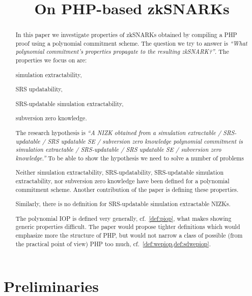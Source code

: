 \documentclass[runningheads,11pt]{llncs}
\title{On PHP-based zkSNARKs}
\author{}
\institute{}
\newcommand{\say}[1]{\emph{``#1''}}
\begin{document}
 \sloppy \maketitle

\begin{abstract}
  In this paper we investigate properties of zkSNARKs obtained by
  compiling a PHP proof using a polynomial commitment scheme. The question we
  try to answer is \say{What polynomial commitment's properties propagate to
    the resulting zkSNARK?}. The properties we focus on are:
  \begin{compactenum}
  \item simulation extractability,
  \item SRS updatability,
  \item SRS-updatable simulation extractability,
  \item subversion zero knowledge.
  \end{compactenum}
  The research hypothesis is \say{A NIZK obtained from a simulation extractable /
    SRS-updatable / SRS updatable SE / subversion zero knowledge polynomial
    commitment is simulation extractable /
    SRS-updatable / SRS updatable SE / subversion zero knowledge.} To be able to
  show the hypothesis we need to solve a number of problems
  \begin{compactenum}
  \item Neither simulation extractability, SRS-updatability, SRS-updatable
    simulation extractability, nor subversion zero knowledge have been defined
    for a polynomial commitment scheme. Another contribution of the paper is
    defining these properties. 
  \item Similarly, there is no definition for SRS-updatable simulation
    extractable NIZKs.
  \item The polynomial IOP is defined very generally, cf.~\cref{def:piop}, what
    makes showing generic properties difficult. The paper would propose tighter
    definitions which would emphasize more the structure of PHP,
    but would not narrow a class of possible (from the practical point of view)
    PHP too much, cf.~\cref{def:wepiop,def:sdwepiop}.
  \end{compactenum}
  
\end{abstract}

\section{Preliminaries}
\end{document}
